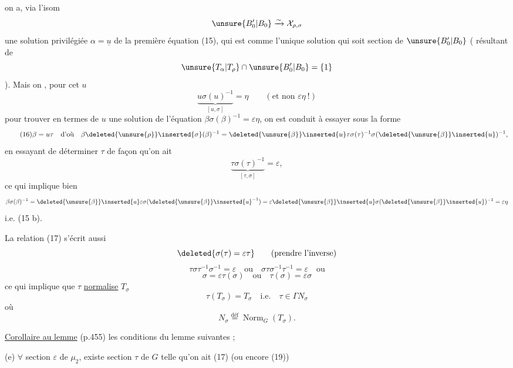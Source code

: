  on a, via l'isom
\[
\unsure{B'_0|B_0}\xrightarrow{\sim}\mathcal X_{\rho,\sigma}
\]
une solution privilégiée $\alpha=\underline u$ de la première équation (15), qui est
 comme l'unique solution qui soit  section de
$\unsure{B'_0|B_0}$ ( résultant de
\[
\unsure{T_\alpha|T_\rho}\cap\unsure{B'_0|B_0}=\{1\}
\]
).
Mais on , pour cet $u$
\[
\underbrace{u\sigma(u)^{-1}}_{[u,\sigma]}=\eta
\qquad(\text{et non }\varepsilon\eta\ !)
\]
pour trouver en termes de $u$ une solution de l'équation
 $\beta\sigma(\beta)^{-1}=\varepsilon\eta$, on est conduit à essayer sous la forme
\[
\tag{16}
\beta=u\tau\quad\text{d'où}\quad
\beta\deleted{\unsure{\rho}}\inserted{\sigma}(\beta)^{-1}
=\deleted{\unsure{\beta}}\inserted{u}\tau\sigma(\tau)^{-1}
\sigma(\deleted{\unsure{\beta}}\inserted{u})^{-1},
\]
en essayant de déterminer $\tau$ de façon qu'on ait
\[
\tag{17}
\underbrace{\tau\sigma(\tau)^{-1}}_{[\tau,\sigma]}=\varepsilon,
\]
ce qui implique bien
\[
\beta\sigma(\beta)^{-1}
=\deleted{\unsure{\beta}}\inserted{u}\varepsilon\sigma(\deleted{\unsure{\beta}}\inserted{u}^{-1})
=\varepsilon\deleted{\unsure{\beta}}\inserted{u}\sigma(\deleted{\unsure{\beta}}\inserted{u})^{-1}
=\varepsilon\eta
\]
i.e. (15 b). 

La relation (17) s'écrit aussi
\[
\deleted{\sigma(\tau)=\varepsilon\tau}
\qquad(\text{prendre l'inverse})
\]
\[
\tag{18}
\tau\sigma\tau^{-1}\sigma^{-1}=\varepsilon
\quad\text{ou}\quad
\sigma\tau\sigma^{-1}\tau^{-1}=\varepsilon
\quad\text{ou}
\]
\[
\tag{19}
\sigma=\varepsilon\tau(\sigma)
\quad\text{ou}\quad
\tau(\sigma)=\varepsilon\sigma
\]
ce qui implique que $\tau$ \uline{normalise} $T_\sigma$
\[
\tag{20}
\tau(T_\sigma)=T_\sigma\quad\text{i.e.}\quad\tau\in\Gamma N_\sigma
\]
où
\[
\tag{21}
N_\sigma\overset{\text{déf}}{=}\operatorname{Norm}_G(T_\sigma).
\]

\uline{Corollaire au lemme} (p.455) les conditions  du lemme
  
  suivantes ;

(e) $\forall$ section 
$\varepsilon$ de $\mu_2$, existe 
section  $\tau$ de $G$ telle qu'on ait (17) (ou encore (19))

